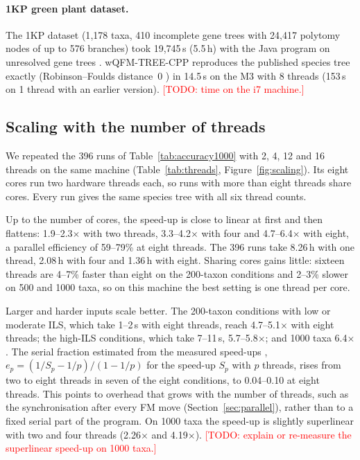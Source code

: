 \documentclass[11pt,a4paper]{article}
\newcommand{\todo}[1]{\textcolor{red}{[TODO: #1]}}
\newcommand{\cpp}{wQFM-TREE-CPP}
\begin{document}
\paragraph{1KP green plant dataset.} The 1KP dataset (1{,}178 taxa, 410 incomplete gene trees with
24{,}417 polytomy nodes of up to 576 branches) took 19{,}745\,s (5.5\,h) with the Java program on
unresolved gene trees \citep{rafi2025wqfmtree}. \cpp{} reproduces the published species tree exactly
(Robinson--Foulds distance~0 \citep{robinson1981}) in 14.5\,s on the M3 with 8 threads (153\,s on 1
thread with an earlier version). \todo{time on the i7 machine.}

\subsection{Scaling with the number of threads}\label{sec:scaling}

We repeated the 396 runs of Table~\ref{tab:accuracy1000} with 2, 4, 12 and 16 threads on the same
machine (Table~\ref{tab:threads}, Figure~\ref{fig:scaling}). Its eight cores run two hardware threads
each, so runs with more than eight threads share cores. Every run gives the same species tree with all
six thread counts.

Up to the number of cores, the speed-up is close to linear at first and then flattens: 1.9--2.3$\times$
with two threads, 3.3--4.2$\times$ with four and 4.7--6.4$\times$ with eight, a parallel efficiency of
59--79\% at eight threads. The 396 runs take 8.26\,h with one thread, 2.08\,h with four and 1.36\,h with
eight. Sharing cores gains little: sixteen threads are 4--7\% faster than eight on the 200-taxon
conditions and 2--3\% slower on 500 and 1000 taxa, so on this machine the best setting is one thread
per core.

Larger and harder inputs scale better. The 200-taxon conditions with low or moderate ILS, which take
1--2\,s with eight threads, reach 4.7--5.1$\times$ with eight threads; the high-ILS conditions, which
take 7--11\,s, 5.7--5.8$\times$; and 1000 taxa 6.4$\times$. The serial fraction estimated from the
measured speed-ups \citep{karp1990}, $e_p = (1/S_p - 1/p)/(1 - 1/p)$ for the speed-up $S_p$ with $p$
threads, rises from two to eight threads in seven of the eight conditions, to 0.04--0.10 at eight
threads. This points to overhead that grows with the number of threads, such as the synchronisation
after every FM move (Section~\ref{sec:parallel}), rather than to a fixed serial part of the program.
On 1000 taxa the speed-up is slightly superlinear with two and four threads (2.26$\times$ and
4.19$\times$). \todo{explain or re-measure the superlinear speed-up on 1000 taxa.}
\end{document}
